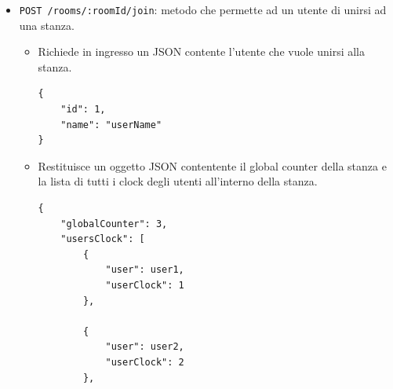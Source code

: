 \documentclass[a4paper]{article}
\begin{document}
\begin{itemize}
    \item \texttt{POST /rooms/:roomId/join}: metodo che permette ad un utente di unirsi ad una stanza.
    \begin{itemize}
        \item Richiede in ingresso un JSON contente l'utente che vuole unirsi alla stanza.
        \begin{verbatim}
{
    "id": 1,
    "name": "userName"
}
        \end{verbatim}
        \item Restituisce un oggetto JSON contentente il global counter della stanza e la lista di tutti i clock degli utenti all'interno della stanza.
        \begin{verbatim}
{
    "globalCounter": 3,
    "usersClock": [
        {
            "user": user1,
            "userClock": 1
        }, 
        
        {
            "user": user2,
            "userClock": 2
        },
        

\end{verbatim}
\end{itemize}
\end{itemize}
\end{document}
